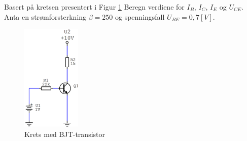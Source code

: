 \begin{question}[name=Oppgave, topic=transBJT]
	Basert på kretsen presentert i Figur \ref{fig:tranBJT2} Beregn verdiene for $I_B$, $I_C$, $I_E$ og $U_{CE}$. Anta en strømforsterkning $\beta=250$ og spenningsfall $U_{BE}=0,7[V]$.

	\begin{figure}[H]
		\centering
		\includegraphics[width=0.25\textwidth]{transistor-BJT/figurer/krets2.png}
		\caption{Krets med BJT-transistor}
		\label{fig:tranBJT2}
	\end{figure}

\end{question}

\vspace{0.5cm} %

